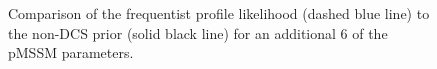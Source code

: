 \begin{figure}[htbp]
{}
\hspace{2mm}
\hspace{2mm}
\caption{Comparison of the frequentist profile likelihood (dashed blue line) to the non-DCS prior (solid black line) for an additional 6 of the pMSSM parameters. }
\label{fig:PandP2}
\end{figure}


